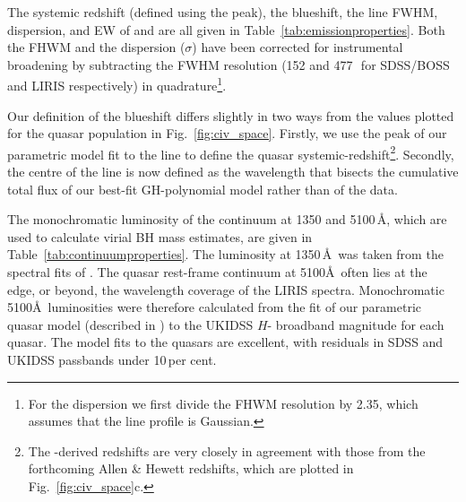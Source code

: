 The systemic redshift (defined using the \ha peak), the  blueshift, the line FWHM, dispersion, and EW of \ha and  are all given in Table~\ref{tab:emissionproperties}.
Both the FHWM and the dispersion ($\sigma$) have been corrected for instrumental broadening by subtracting the FWHM resolution (152 and 477\,\kms\, for SDSS/BOSS and LIRIS respectively) in quadrature\footnote{For the dispersion we first divide the FHWM resolution by 2.35, which assumes that the line profile is Gaussian.}. 
 
Our definition of the  blueshift differs slightly in two ways from the values plotted for the quasar population in Fig.~\ref{fig:civ_space}. 
Firstly, we use the peak of our parametric model fit to the \ha line to define the quasar systemic-redshift\footnote{The \hans-derived redshifts are very closely in agreement with those from the forthcoming Allen \& Hewett redshifts, which are plotted in Fig.~\ref{fig:civ_space}c.}.  
Secondly, the centre of the  line is now defined as the wavelength that bisects the cumulative total flux of our best-fit GH-polynomial model rather than of the data. 

The monochromatic luminosity of the continuum at 1350 and 5100\,\AA, which are used to calculate virial BH mass estimates, are given in Table~\ref{tab:continuumproperties}. 
The luminosity at 1350\,\AA\, was taken from the spectral fits of \citet{shen11}.
The quasar rest-frame continuum at 5100\AA \ often lies at the edge, or beyond, the wavelength coverage of the LIRIS spectra. 
Monochromatic 5100\AA \ luminosities were therefore calculated from the fit of our parametric quasar model (described in \citet{maddox12}) to the UKIDSS $H$- broadband magnitude for each quasar. 
The model fits to the quasars are excellent, with residuals in SDSS and UKIDSS passbands under 10\,per cent. 


